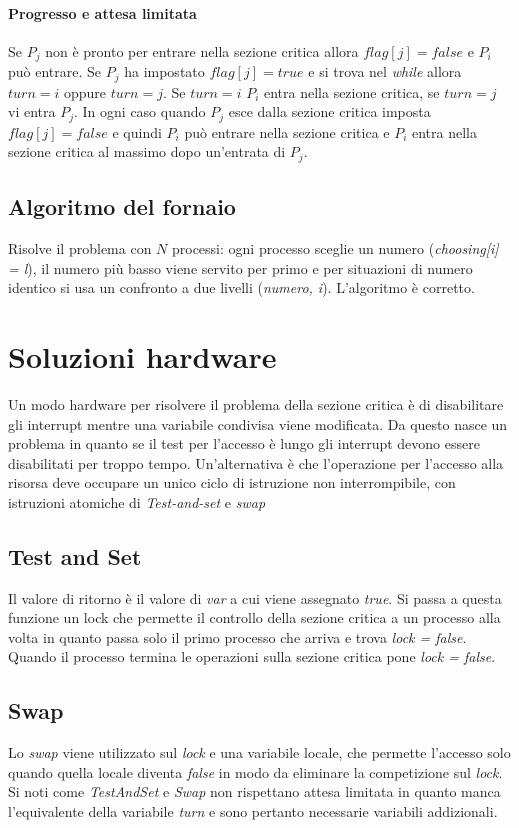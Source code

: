 \paragraph{Progresso e attesa limitata}
Se $P_j$ non \`e pronto per entrare nella sezione critica allora $flag[j]=false$ e $P_i$ pu\`o entrare. Se $P_j$ ha impostato $flag[j]=true$ e si trova nel \emph{while} allora $turn = i$
oppure $turn = j$. Se $turn = i$ $P_i$ entra nella sezione critica, se $turn = j$ vi entra $P_j$. In ogni caso quando $P_j$ esce dalla sezione critica imposta $flag[j]=false$ e 
quindi $P_i$ pu\`o entrare nella sezione critica e $P_i$ entra nella sezione critica al massimo dopo un'entrata di $P_j$. 
\subsection{Algoritmo del fornaio}
Risolve il problema con $N$ processi: ogni processo sceglie un numero (\emph{choosing[i] = l}), il numero pi\`u basso viene servito per primo e per situazioni di numero identico si
usa un confronto a due livelli (\emph{numero, i}). L'algoritmo \`e corretto. 

\section{Soluzioni hardware}
Un modo hardware per risolvere il problema della sezione critica \`e di disabilitare gli interrupt mentre una variabile condivisa viene modificata. Da questo nasce un problema in quanto
se il test per l'accesso \`e lungo gli interrupt devono essere disabilitati per troppo tempo. Un'alternativa \`e che l'operazione per l'accesso alla risorsa deve occupare un unico ciclo
di istruzione non interrompibile, con istruzioni atomiche di \emph{Test-and-set} e \emph{swap}
\subsection{Test and Set}

Il valore di ritorno \`e il valore di \emph{var} a cui viene assegnato \emph{true}. Si passa a questa funzione un lock che permette il controllo della sezione critica a un processo alla 
volta in quanto passa solo il primo processo che arriva e trova \emph{lock = false}. Quando il processo termina le operazioni sulla sezione critica pone \emph{lock = false}.
\subsection{Swap}

Lo \emph{swap} viene utilizzato sul \emph{lock} e una variabile locale, che permette l'accesso solo quando quella locale diventa \emph{false} in modo da eliminare la competizione sul
\emph{lock}. Si noti come \emph{TestAndSet} e \emph{Swap} non rispettano attesa limitata in quanto manca l'equivalente della variabile \emph{turn} e sono pertanto necessarie variabili
addizionali.

